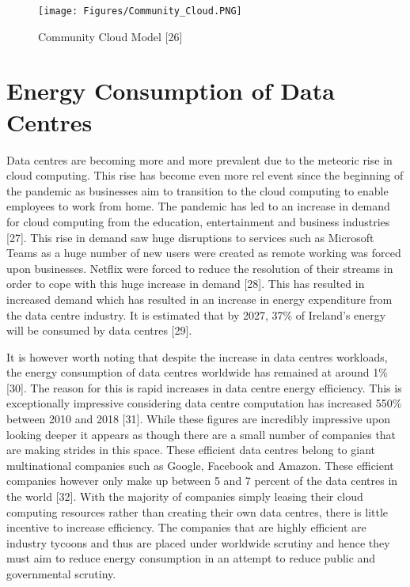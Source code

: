 \documentclass[oneside,12pt]{Classes/RoboticsLaTeX}
\begin{document}
\begin{figure}[h]
\centering
\texttt{[image: Figures/Community\_Cloud.PNG]}
\caption{Community Cloud Model [26]}
\end{figure}

\section{Energy Consumption of Data Centres}
Data centres are becoming more and more prevalent due to the meteoric rise in cloud computing. This rise has become even more rel event since the beginning of the pandemic as businesses aim to transition to the cloud computing to enable employees to work from home. The pandemic has led to an increase in demand for cloud computing from the education, entertainment and business industries [27]. This rise in demand saw huge disruptions to services such as Microsoft Teams as a huge number of new users were created as remote working was forced upon businesses. Netflix were forced to reduce the resolution of their streams in order to cope with this huge increase in demand [28]. This has resulted in increased demand which has resulted in an increase in energy expenditure from the data centre industry. It is estimated that by 2027, 37\% of Ireland's energy will be consumed by data centres [29]. 

It is however worth noting that despite the increase in data centres workloads, the energy consumption of data centres worldwide has remained at around 1\% [30]. The reason for this is rapid increases in data centre energy efficiency. This is exceptionally impressive considering data centre computation has increased 550\% between 2010 and 2018 [31]. While these figures are incredibly impressive upon looking deeper it appears as though there are a small number of companies that are making strides in this space. These efficient data centres belong to giant multinational companies such as Google, Facebook and Amazon. These efficient companies however only make up between 5 and 7 percent of the data centres in the world [32]. With the majority of companies simply leasing their cloud computing resources rather than creating their own data centres, there is little incentive to increase efficiency. The companies that are highly efficient are industry tycoons and thus are placed under worldwide scrutiny and hence they must aim to reduce energy consumption in an attempt to reduce public and governmental scrutiny. 
\end{document}
